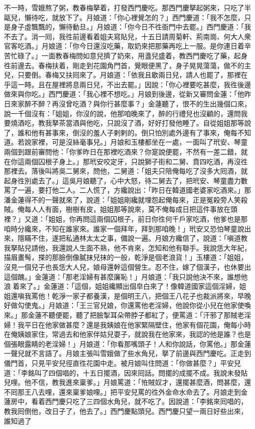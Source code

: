 不一時，雪娥熬了粥，教春梅拏着，打發西門慶吃。那西門慶拏起粥來，只吃了半甌兒，懶待吃，就放下了。月娘道：「你心裡覺怎的？」西門慶道：「我不怎麼，只是身子虛飄飄的，懶待動旦。」{}月娘道：「你今日不徃衙門中去罷。」西門慶道：「我不去了。消一囘，我徃前邊看着姐夫寫貼兒，十五日請周菊軒、荊南崗、何大人衆官客吃酒。」月娘道：「你今日還沒吃藥，取奶來把那藥再吃上一服。是你連日着辛苦忙碌了。」一面教春梅問如意兒擠了奶來，用盞兒盛着，教西門慶吃了藥，起身徃前邊去。春梅扶着，剛走到花園角門首，覺眼便黑了，身子晃晃蕩蕩，做不的主兒，只要倒。春梅又扶囘來了。月娘道：「依我且歇兩日兒，請人也罷了，那裡在乎這一時。且在屋裡將息兩日兒，不出去罷。」因說：「你心裡要吃甚麼，我徃後邊做來與你吃。」西門慶道：「我心裡不想吃。」月娘到後邊，從新又審問金蓮：「他昨日來家醉不醉？再沒曾吃酒？與你行甚麼事？」金蓮聽了，恨不的生出幾個口來，說一千個沒有：「姐姐，你沒的說，他那咱晚來了，醉的行禮兒也沒顧的，還問我要燒酒吃，教我拏茶當酒與他吃，只說沒了酒，好好打發他睡了。自從姐姐那等說了，誰和他有甚事來，倒沒的羞人子剌剌的。倒只怕別處外邊有了事來，俺每不知道。若說家裡，可是沒絲毫事兒。」{}月娘和玉樓都坐在一處，一面叫了玳安、琴童兩個到跟前審問他：「你爹昨日在那裡吃酒來？你寔說便罷，不然有一差二錯，就在你這兩個囚根子身上。」那玳安咬定牙，只說獅子街和二舅、賁四吃酒，再沒徃那裡去。{}落後叫將吳二舅來，問他，二舅道：「姐夫只陪俺每吃了沒多大囘酒，就起身徃別處去了。」這吳月娘聽了，心中大怒，待二舅去了，把玳安、琴童盡力數罵了一遍，要打他二人。二人慌了，方纔說出：「昨日在韓道國老婆家吃酒來。」那潘金蓮得不的一聲就來了，說道：「姐姐剛纔就埋怨起俺每來，正是冤殺旁人笑殺賊。俺每人人有面，樹樹有皮，姐姐那等說來，莫不俺每成日把這件事放在頭裡？」{}又道：「姐姐，你再問這兩個囚根子，前日你徃何千戶家吃酒，他爹也是那咱時分纔來，不知在誰家來。誰家一個拜年，拜到那咱晚！」玳安又恐怕琴童說出來，隱瞞不住，遂把私通林太太之事，備說一遍。月娘方纔信了，說道：「嗔道教我拏貼兒請他，我還說人生面不熟，他不肯來，怎知和他有聯手。我說恁大年紀，描眉畫髩，搽的那臉倒像膩抹兒抹的一般，乾淨是個老浪貨！」玉樓道：「姐姐，沒見一個兒子也長恁大人兒，娘母還幹這個營生。忍不住，嫁了個漢子，也休要出這個醜。」金蓮道：「那老淫婦有甚麼廉恥！」月娘道：「我只說他決不來，誰想他浪𢵞着來了。」金蓮道：「這個，姐姐纔顯出個皁白來了！像韓道國家這個淫婦，姐姐還嗔我罵他！乾淨一家子都養漢，是個明王八，把個王八花子也裁派將來，早晚好做勾使鬼。」月娘道：「王三官兒娘，你還罵他老淫婦，他說你從小兒在他家使喚來。」{}那金蓮不聽便罷，聽了把臉掣耳朵帶脖子都紅了，{}{}便罵道：「汗邪了那賊老淫婦！我平日在他家做甚麼？還是我姨娘在他家緊隔壁住，他家有個花園，俺每小時在俺姨娘家住，常過去和他家伴姑兒耍子，就說我在他家來，我認的他是誰？也是個張眼露睛的老淫婦！」月娘道：「你看那嘴頭子！人和你說話，你罵他。」那金蓮一聲兒就不言語了。月娘主張叫雪娥做了些水角兒，拏了前邊與西門慶吃。正走到儀門首，只見平安兒徑直徃花園中走。被月娘叫住問道：「你做甚麼？」平安兒道：「李銘叫了四個唱的，十五日擺酒，因來囘話。問擺的成擺不成。我說未發貼兒哩。他不信，教我進來稟爹。」月娘罵道：「恠賊奴才，還擺甚麼酒，問甚麼，還不囘那王八去哩，還來稟爹娘哩。」把平安兒罵的徃外金命水命去了。月娘走到金蓮房中，看着西門慶只吃了三四個水角兒，就不吃了。因說道：「李銘來囘唱的，教我囘倒他，改日子了，他去了。」西門慶點頭兒。西門慶只望一兩日好些出來，誰知過了